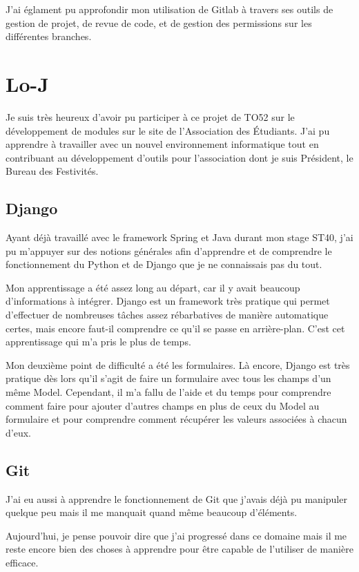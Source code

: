 \documentclass[a4paper]{report}
\begin{document}
\par J'ai églament pu approfondir mon utilisation de Gitlab à travers ses outils de gestion de projet, de revue de code,
et de gestion des permissions sur les différentes branches.

\section{Lo-J}
\label{sec:lo_j}
\par Je suis très heureux d’avoir pu participer à ce projet de TO52 sur le développement de modules sur le site de l’Association des Étudiants. J’ai pu apprendre à travailler avec un nouvel environnement informatique tout en contribuant au développement d’outils pour l’association dont je suis Président, le Bureau des Festivités.

\subsection{Django}
\par Ayant déjà travaillé avec le framework Spring et Java durant mon stage ST40, j’ai pu m’appuyer sur des notions générales afin d’apprendre et de comprendre le fonctionnement du Python et de Django que je ne connaissais pas du tout.

\par Mon apprentissage a été assez long au départ, car il y avait beaucoup d’informations à intégrer. Django est un framework très pratique qui permet d’effectuer de nombreuses tâches assez rébarbatives de manière automatique certes, mais encore faut-il comprendre ce qu’il se passe en arrière-plan. C’est cet apprentissage qui m’a pris le plus de temps.

\par Mon deuxième point de difficulté a été les formulaires. Là encore, Django est très pratique dès lors qu’il s’agit de faire un formulaire avec tous les champs d’un même Model. Cependant, il m’a fallu de l’aide et du temps pour comprendre comment faire pour ajouter d’autres champs en plus de ceux du Model au formulaire et pour comprendre comment récupérer les valeurs associées à chacun d’eux.

\subsection{Git}
\par J’ai eu aussi à apprendre le fonctionnement de Git que j’avais déjà pu manipuler quelque peu mais il me manquait quand même beaucoup d’éléments.

\par Aujourd’hui, je pense pouvoir dire que j’ai progressé dans ce domaine mais il me reste encore bien des choses à apprendre pour être capable de l’utiliser de manière efficace.
\end{document}

